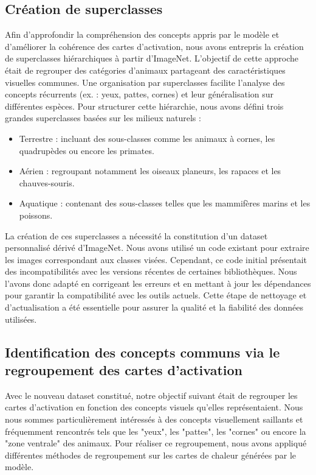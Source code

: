 \documentclass[runningheads]{llncs}
\begin{document}
\subsection{Création de superclasses}

Afin d’approfondir la compréhension des concepts appris par le modèle et d’améliorer la cohérence des cartes d'activation, nous avons entrepris la création de superclasses hiérarchiques à partir d’ImageNet. L’objectif de cette approche était de regrouper des catégories d’animaux partageant des caractéristiques visuelles communes. Une organisation par superclasses facilite l’analyse des concepts récurrents (ex. : yeux, pattes, cornes) et leur généralisation sur différentes espèces. Pour structurer cette hiérarchie, nous avons défini trois grandes superclasses basées sur les milieux naturels :
\begin{itemize}
    \item Terrestre : incluant des sous-classes comme les animaux à cornes, les quadrupèdes ou encore les primates.
    \item Aérien : regroupant notamment les oiseaux planeurs, les rapaces et les chauves-souris.
    \item Aquatique : contenant des sous-classes telles que les mammifères marins et les poissons.
\end{itemize}
La création de ces superclasses a nécessité la constitution d’un dataset personnalisé dérivé d’ImageNet. Nous avons utilisé un code existant pour extraire les images correspondant aux classes visées. Cependant, ce code initial présentait des incompatibilités avec les versions récentes de certaines bibliothèques. Nous l’avons donc adapté en corrigeant les erreurs et en mettant à jour les dépendances pour garantir la compatibilité avec les outils actuels. Cette étape de nettoyage et d’actualisation a été essentielle pour assurer la qualité et la fiabilité des données utilisées.

\subsection{Identification des concepts communs via le regroupement des cartes d'activation}

Avec le nouveau dataset constitué, notre objectif suivant était de regrouper les cartes d'activation en fonction des concepts visuels qu’elles représentaient. Nous nous sommes particulièrement intéressés à des concepts visuellement saillants et fréquemment rencontrés tels que les "yeux", les "pattes", les "cornes" ou encore la "zone ventrale" des animaux. Pour réaliser ce regroupement, nous avons appliqué différentes méthodes de regroupement sur les cartes de chaleur générées par le modèle.
\end{document}
